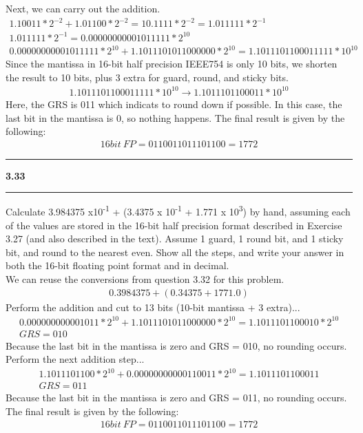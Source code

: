 \documentclass[11pt]{article}
\newcommand\question[2]{\vspace{.25in}\hrule\textbf{#1 #2}\vspace{.5em}\hrule\vspace{.10in}}
\begin{document}
Next, we can carry out the addition.
\begin{gather*}
1.10011*2^{-2} + 1.01100*2^{-2} = 10.1111*2^{-2} = 1.011111*2^{-1} \\
1.011111*2^{-1} = 0.00000000001011111*2^{10} \\
 0.00000000001011111*2^{10} + 1.1011101011000000*2^{10}  = 1.1011101100011111*10^{10}
\end{gather*}
Since the mantissa in 16-bit half precision IEEE754 is only 10 bits, we shorten the result to 10 bits, plus 3 extra for guard, round, and sticky bits.
\begin{gather*}
1.1011101100011111*10^{10} \rightarrow 1.1011101100011*10^{10}
\end{gather*}
Here, the GRS is 011 which indicats to round down if possible. In this case, the last bit in the mantissa is 0, so nothing happens.
The final result is given by the following:
\begin{gather*}
16bit \: FP = 0110011011101100 = 1772
\end{gather*}

\question{3.33}{} 
 Calculate  3.984375 x10\textsuperscript{-1} + (3.4375 x 10\textsuperscript{-1} + 1.771 x 10\textsuperscript{3}) by hand, assuming each of the values are stored in the 16-bit half precision format described in Exercise 3.27 (and also described in the  text). Assume 1 guard, 1 round bit, and 1 sticky bit, and round to the nearest even. Show all the steps, and  write your answer in both the 16-bit floating point format and in decimal.\\[1em]

We can reuse the conversions from question 3.32 for this problem.
\begin{gather*}
0.3984375 + (0.34375 + 1771.0)
\end{gather*}
Perform the addition and cut to 13 bits (10-bit mantissa + 3 extra)...
\begin{gather*}
0.000000000001011 * 2^{10} + 1.1011101011000000*2^{10} = 1.1011101100010 * 2^{10} \\
GRS = 010
\end{gather*}
Because the last bit in the mantissa is zero and GRS = 010, no rounding occurs. Perform the next addition step...
\begin{gather*}
1.1011101100 * 2^{10} + 0.00000000000110011 * 2^{10} = 1.1011101100011 \\
GRS = 011
\end{gather*}
Because the last bit in the mantissa is zero and GRS = 011, no rounding occurs. The final result is given by the following:
\begin{gather*}
16bit \: FP = 0110011011101100 = 1772
\end{gather*}
\end{document}
